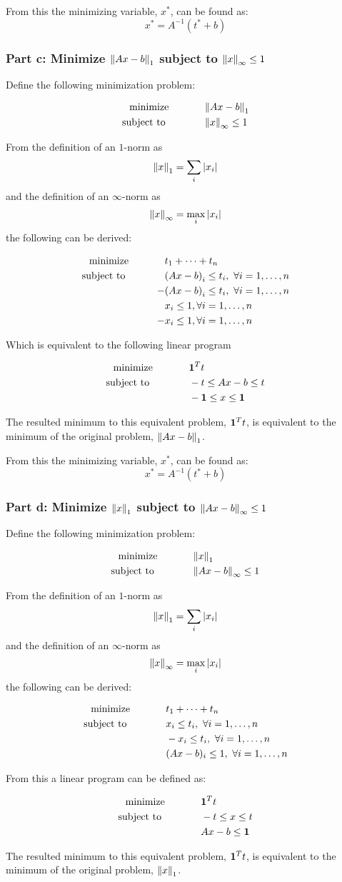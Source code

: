 \documentclass[letter]{article}
\newcommand{\optpblm}[3][eq:default]{
	\begin{equation}\label{#1}
		\begin{aligned}
			\text{minimize} \hspace{0.5in} &#2\vspace{5pt}\\
			\text{subject to \hspace{0.5in}} &#3
		\end{aligned}	
	\end{equation}
}
\begin{document}
From this the minimizing variable, $x^*$, can be found as: $$x^* = A^{-1} (t^* + b)$$



\newpage
\subsubsection{Part c: Minimize $\norm{Ax-b}_1$ subject to $\norm{x}_{\infty}\leq 1$}
Define the following minimization problem:
\optpblm{\norm{Ax-b}_1}{\norm{x}_\infty \leq 1}
From the definition of an $1$-norm as $$\norm{x}_1 = \sum_i \abs{x_i}$$ and the definition of an $\infty$-norm as $$\norm{x}_\infty = \max_i \abs{x_i}$$ the following can be derived:
\optpblm{t_1 + \cdots + t_n}{\qty(Ax - b)_i\leq t_i, \ \forall i = 1,\dots,n\\
	-& \qty(Ax - b)_i\leq t_i, \ \forall i = 1,\dots,n\\
	 & x_i \leq 1, \forall i = 1,\dots,n\\
	-& x_i \leq 1, \forall i = 1,\dots,n}
Which is equivalent to the following linear program
\optpblm{\vb{1}^T t}{-t \leq Ax - b \leq t\\
					&-\vb{1} \leq x \leq \vb{1}}

The resulted minimum to this equivalent problem, $\vb{1}^T t$, is equivalent to the minimum of the original problem, $\norm{Ax-b}_1$.

From this the minimizing variable, $x^*$, can be found as: $$x^* = A^{-1} (t^* + b)$$



\newpage
\subsubsection{Part d: Minimize $\norm{x}_1$ subject to $\norm{Ax-b}_\infty \leq 1$}
Define the following minimization problem:
\optpblm{\norm{x}_1}{\norm{Ax-b}_\infty \leq 1}
From the definition of an $1$-norm as $$\norm{x}_1 = \sum_i \abs{x_i}$$ and the definition of an $\infty$-norm as $$\norm{x}_\infty = \max_i \abs{x_i}$$ the following can be derived:
\optpblm{t_1 + \cdots + t_n}{x_i \leq t_i, \ \forall i = 1,\dots,n\\
							&-x_i \leq t_i, \ \forall i = 1,\dots,n\\
							&(Ax-b)_i \leq 1, \ \forall i = 1,\dots,n}
From this a linear program can be defined as:
\optpblm{\vb{1}^T t}{-t \leq x \leq t\\
			 		&Ax - b \leq \vb{1}}

The resulted minimum to this equivalent problem, $\vb{1}^T t$, is equivalent to the minimum of the original problem, $\norm{x}_1$.
\end{document}
